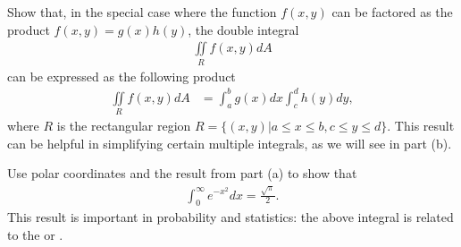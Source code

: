 \item %
\BEN
\item
Show that, in the special case where the function $f(x,y)$ can be factored as the product $f(x,y) = g(x)h(y)$, the double integral 
\begin{align*}
   \iint\limits_{R} f(x,y) dA 
\end{align*}
can be expressed as the following product 
\begin{align*}
   \iint\limits_{R} f(x,y) dA 
  & = \int_a^b g(x) dx \int_c^d h(y) dy  ,
\end{align*}
where $R$ is the rectangular region $R=\{(x,y) | a \le x \le b, c\le y \le d\}$. 
This result can be helpful in simplifying certain multiple integrals, as we will see in part (b).
\item Use polar coordinates and the result from part (a) to show that 
\begin{align*}
   \int_{0}^{\infty} e^{-x^2} dx
   = \frac{\sqrt{\pi}}{2}.
\end{align*}
This result is important in probability and statistics: the above integral is related to the  or . 
\EEN
\EEN %
